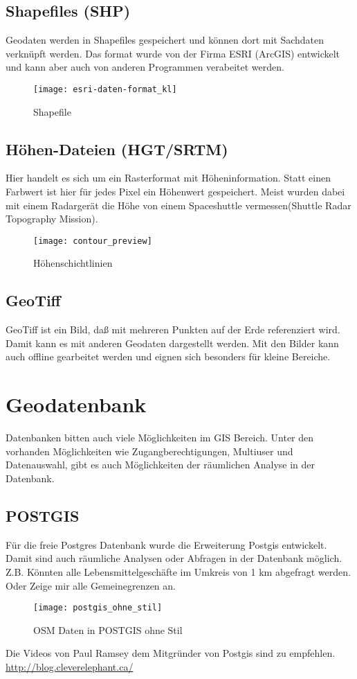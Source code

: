 \documentclass[11pt,fleqn]{book} %
\begin{document}
\subsection{Shapefiles (SHP)}
Geodaten werden in Shapefiles gespeichert und k\"onnen dort mit Sachdaten verkn\"upft werden.  Das format wurde von der Firma ESRI (ArcGIS) entwickelt und kann aber auch von anderen Programmen verabeitet werden.
\begin{figure}[h]
\centering\texttt{[image: esri-daten-format\_kl]}
\caption{Shapefile}
\end{figure}


\subsection{H\"ohen-Dateien (HGT/SRTM)}
Hier handelt es sich um ein Rasterformat mit H\"oheninformation. Statt einen Farbwert ist hier f\"ur jedes Pixel ein H\"ohenwert gespeichert. Meist wurden dabei mit einem Radarger\"at die H\"ohe von einem Spaceshuttle vermessen(Shuttle Radar Topography Mission). 
\begin{figure}[h]
\centering\texttt{[image: contour\_preview]}
\caption{H\"ohenschichtlinien}
\end{figure}


\subsection{GeoTiff}
GeoTiff ist ein Bild, da{\ss} mit mehreren Punkten auf der Erde referenziert wird. Damit kann es mit anderen Geodaten dargestellt werden. Mit den Bilder kann auch offline gearbeitet werden und eignen sich besonders f\"ur kleine Bereiche. 

\section{Geodatenbank}
Datenbanken bitten auch viele M\"oglichkeiten im GIS Bereich. Unter den vorhanden M\"oglichkeiten wie Zugangberechtigungen, Multiuser und Datenauswahl, gibt es auch Möglichkeiten der r\"aumlichen Analyse in der Datenbank. 

\subsection{POSTGIS}
F\"ur die freie Postgres Datenbank wurde die Erweiterung Postgis entwickelt. Damit sind auch r\"aumliche Analysen oder Abfragen in der Datenbank m\"oglich. Z.B. K\"onnten alle Lebensmittelgesch\"afte im Umkreis von 1 km abgefragt werden. Oder Zeige mir alle Gemeinegrenzen an.    
\begin{figure}[h]
\centering\texttt{[image: postgis\_ohne\_stil]}
\caption{OSM Daten in POSTGIS ohne Stil}
\end{figure}
Die Videos von Paul Ramsey dem Mitgr\"under von Postgis sind zu empfehlen. \url{http://blog.cleverelephant.ca/}
\end{document}

